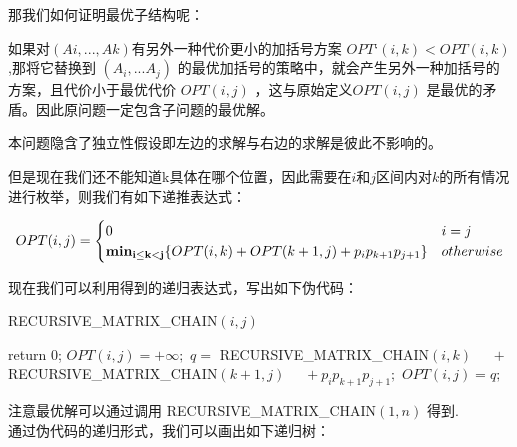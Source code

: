 那我们如何证明最优子结构呢：

如果对$(Ai,...,Ak)$有另外一种代价更小的加括号方案 $OPT‘(i,k) <OPT(i,k)$,那将它替换到 $(A_i,...A_j)$ 的最优加括号的策略中，就会产生另外一种加括号的方案，且代价小于最优代价 $OPT(i,j)$ ，这与原始定义$OPT(i,j)$ 是最优的矛盾。因此原问题一定包含子问题的最优解。

本问题隐含了独立性假设即左边的求解与右边的求解是彼此不影响的。

但是现在我们还不能知道k具体在哪个位置，因此需要在$i$和$j$区间内对$k$的所有情况进行枚举，则我们有如下递推表达式：

\begin{equation}
OPT(i, j) =
\begin{cases} 0 & i=j \\
{\bf min_{i\leq k < j} } \{OPT(i, k) + OPT(k+1, j) + p_ip_{k+1}p_{j+1} \} & otherwise
\end{cases} \nonumber
\end{equation}


现在我们可以利用得到的递归表达式，写出如下伪代码：
\\


\begin{small}
{\sc RECURSIVE\_MATRIX\_CHAIN}$( i, j)$
\begin{algorithmic}[1]
\STATE return $0$;
\ENDIF
\STATE $OPT(i, j) = +\infty;$
\STATE $q = $ {\sc RECURSIVE\_MATRIX\_CHAIN}$(i, k)$
\STATE $\quad  + $ {\sc RECURSIVE\_MATRIX\_CHAIN}$(k+1, j)$
\STATE $\quad  + p_ip_{k+1}p_{j+1} ;$
\STATE $OPT(i, j) = q;$
\ENDIF
\ENDFOR
{}
\end{algorithmic}
\end{small}
注意最优解可以通过调用 {\sc RECURSIVE\_MATRIX\_CHAIN}$(1, n)$ 得到.
\\

通过伪代码的递归形式，我们可以画出如下递归树：


